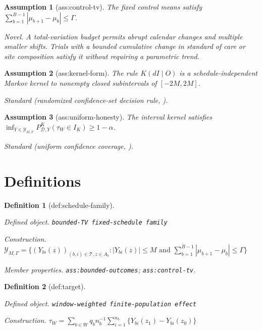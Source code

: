 \documentclass{article}
\newtheorem{assumption}{Assumption}
\newtheorem{definition}{Definition}
\begin{document}
\begin{assumption}[ass:control-tv]\label{ass:control-tv}
The fixed control means satisfy \(\sum_{b=1}^{B-1}|\mu_{b+1}-\mu_b|\le\Gamma\).
\par\smallskip\noindent\emph{Novel.} A total-variation budget permits abrupt calendar changes and multiple smaller shifts. Trials with a bounded cumulative change in standard of care or site composition satisfy it without requiring a parametric trend.
\end{assumption}

\begin{assumption}[ass:kernel-form]\label{ass:kernel-form}
The rule \(K(dI\mid O)\) is a schedule-independent Markov kernel to nonempty closed subintervals of \([-2M,2M]\).
\par\smallskip\noindent\emph{Standard} (randomized confidence-set decision rule, \cite{EvansHansenStark2005}).
\end{assumption}

\begin{assumption}[ass:uniform-honesty]\label{ass:uniform-honesty}
The interval kernel satisfies \(\inf_{Y\in\mathcal Y_{M,\Gamma}}P^K_{\mathcal D,Y}(\tau_W\in I_K)\ge1-\alpha\).
\par\smallskip\noindent\emph{Standard} (uniform confidence coverage, \cite{EvansHansenStark2005}).
\end{assumption}

\section{Definitions}

\begin{definition}[def:schedule-family]\label{def:schedule-family}
\par\smallskip\noindent\emph{Defined object.} \texttt{bounded-\allowbreak{}TV fixed-\allowbreak{}schedule family}
\par\smallskip\noindent\emph{Construction.} \(\mathcal Y_{M,\Gamma}=\{(Y_{bi}(z))_{(b,i)\in\mathcal T,z\in A_b}: |Y_{bi}(z)|\le M\text{ and }\sum_{b=1}^{B-1}|\mu_{b+1}-\mu_b|\le\Gamma\}\)
\par\smallskip\noindent\emph{Member properties.} \texttt{ass:\allowbreak{}bounded-\allowbreak{}outcomes}; \texttt{ass:\allowbreak{}control-\allowbreak{}tv}.
\end{definition}

\begin{definition}[def:target]\label{def:target}
\par\smallskip\noindent\emph{Defined object.} \texttt{window-\allowbreak{}weighted finite-\allowbreak{}population effect}
\par\smallskip\noindent\emph{Construction.} \(\tau_W=\sum_{b\in W}q_b n_b^{-1}\sum_{i=1}^{n_b}\{Y_{bi}(z_1)-Y_{bi}(z_0)\}\)
\end{definition}
\end{document}
